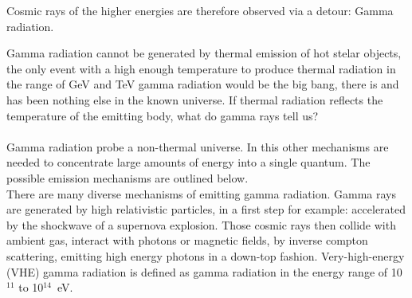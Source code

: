 \documentclass[12pt,article,type=msc,colorback,accentcolor=tud9c]{tudthesis}
\begin{document}
Cosmic rays of the higher energies are therefore observed via a detour: Gamma radiation. \\
\begin{wrapfigure}{R}{0.5\textwidth}
\texttt{[image: D:/OwnCloudData/00\_WriteUP/04\_Thesis/Pic/Proposal/Fig/\{Fermi\_image01]}.jpg}
\caption[Fermi LAT]{\label{fig:LAT}FermiLAT Picuture from \cite{FermiLAT}}
\end{wrapfigure}



Gamma radiation cannot be generated by thermal emission of hot stelar objects, the only event with a high enough temperature to produce thermal radiation in the range of GeV and TeV gamma radiation would be the big bang, there is and has been nothing else in the known universe. If thermal radiation reflects the temperature of the emitting body, what do gamma rays tell us?\\\\
Gamma radiation probe a non-thermal universe. In this other mechanisms are needed to concentrate large amounts of energy into a single quantum. The possible emission mechanisms are outlined below.\\
There are many diverse mechanisms of emitting gamma radiation. Gamma rays are generated by high relativistic particles, in a first step for example: accelerated by the shockwave of a supernova explosion. Those cosmic rays then collide with ambient gas, interact with photons or magnetic fields, by inverse compton scattering, emitting high energy photons in a down-top fashion. Very-high-energy (VHE) gamma radiation is defined as gamma radiation in the energy range of 10$^{11}$ to 10$^{14}$~eV.\\
\end{document}
